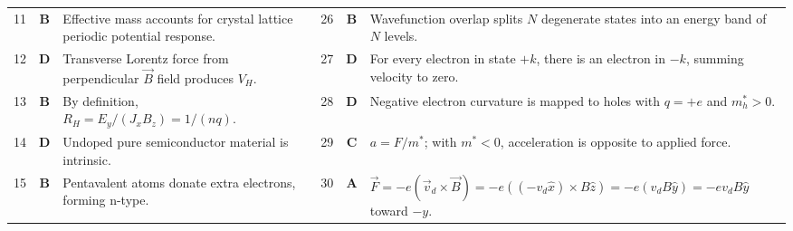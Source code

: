 \begin{table}[htbp]
\begin{tabularx}{\textwidth}{l c X l c X}
11 & \textbf{B} & Effective mass accounts for crystal lattice periodic potential response. & 26 & \textbf{B} & Wavefunction overlap splits $N$ degenerate states into an energy band of $N$ levels. \\
12 & \textbf{D} & Transverse Lorentz force from perpendicular $\vec{B}$ field produces $V_H$. & 27 & \textbf{D} & For every electron in state $+k$, there is an electron in $-k$, summing velocity to zero. \\
13 & \textbf{B} & By definition, $R_H = E_y / (J_x B_z) = 1/(nq)$. & 28 & \textbf{D} & Negative electron curvature is mapped to holes with $q = +e$ and $m_h^* > 0$. \\
14 & \textbf{D} & Undoped pure semiconductor material is intrinsic. & 29 & \textbf{C} & $a = F/m^*$; with $m^* < 0$, acceleration is opposite to applied force. \\
15 & \textbf{B} & Pentavalent atoms donate extra electrons, forming n-type. & 30 & \textbf{A} & $\vec{F} = -e(\vec{v}_d \times \vec{B}) = -e((-v_d\hat{x}) \times B\hat{z}) = -e(v_d B \hat{y}) = -e v_d B \hat{y}$ toward $-y$. \\
\bottomrule
\end{tabularx}
\end{table}

